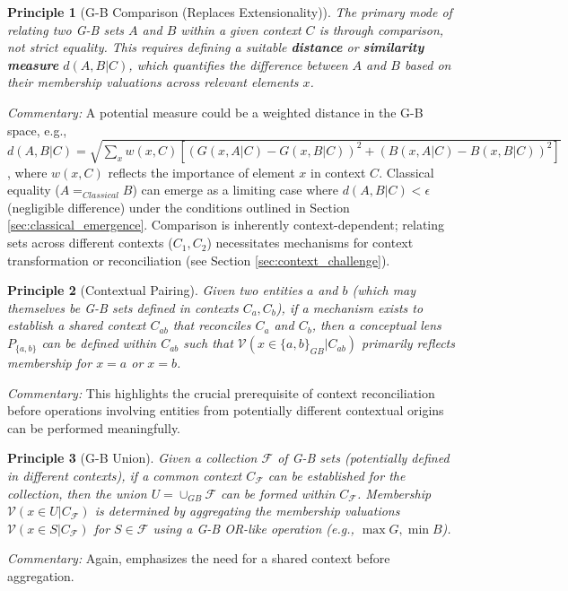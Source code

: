 \documentclass[11pt]{article}
\newcommand{\gbval}[1]{\mathcal{V}(#1)}         %
\newcommand{\gcomp}[1]{G(#1)}                   %
\newcommand{\bcomp}[1]{B(#1)}                   %
\newcommand{\pset}[1]{P_{#1}}                   %
\theoremstyle{definition}
\theoremstyle{plain}
\newtheorem{principle}{Principle}[section] %
\begin{document}
\begin{principle}[G-B Comparison (Replaces Extensionality)]
The primary mode of relating two G-B sets $A$ and $B$ within a given context $C$ is through comparison, not strict equality. This requires defining a suitable \textbf{distance} or \textbf{similarity measure} $d(A, B | C)$, which quantifies the difference between $A$ and $B$ based on their membership valuations across relevant elements $x$.
\end{principle}
\textit{Commentary:} A potential measure could be a weighted distance in the G-B space, e.g., $d(A, B | C) = \sqrt{\sum_x w(x,C) [ (\gcomp{x, A|C}-\gcomp{x, B|C})^2 + (\bcomp{x, A|C}-\bcomp{x, B|C})^2 ]}$, where $w(x,C)$ reflects the importance of element $x$ in context $C$. Classical equality ($A =_{Classical} B$) can emerge as a limiting case where $d(A, B | C) < \epsilon$ (negligible difference) under the conditions outlined in Section \ref{sec:classical_emergence}. Comparison is inherently context-dependent; relating sets across different contexts ($C_1, C_2$) necessitates mechanisms for context transformation or reconciliation (see Section \ref{sec:context_challenge}).

\begin{principle}[Contextual Pairing]
Given two entities $a$ and $b$ (which may themselves be G-B sets defined in contexts $C_a, C_b$), if a mechanism exists to establish a shared context $C_{ab}$ that reconciles $C_a$ and $C_b$, then a conceptual lens $\pset{\{a,b\}}$ can be defined within $C_{ab}$ such that $\gbval{x \in \{a, b\}_{GB} | C_{ab}}$ primarily reflects membership for $x=a$ or $x=b$.
\end{principle}
\textit{Commentary:} This highlights the crucial prerequisite of context reconciliation before operations involving entities from potentially different contextual origins can be performed meaningfully.

\begin{principle}[G-B Union]
Given a collection $\mathcal{F}$ of G-B sets (potentially defined in different contexts), if a common context $C_{\mathcal{F}}$ can be established for the collection, then the union $U = \cup_{GB} \mathcal{F}$ can be formed within $C_{\mathcal{F}}$. Membership $\gbval{x \in U | C_{\mathcal{F}}}$ is determined by aggregating the membership valuations $\gbval{x \in S | C_{\mathcal{F}}}$ for $S \in \mathcal{F}$ using a G-B OR-like operation (e.g., $\max G, \min B$).
\end{principle}
\textit{Commentary:} Again, emphasizes the need for a shared context before aggregation.
\end{document}
